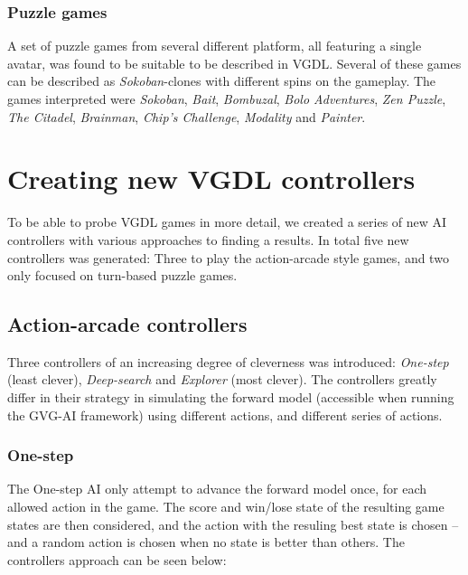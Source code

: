 \documentclass[a4paper,titlepage,final, twoside]{report}
\begin{document}
\subsubsection*{Puzzle games}
A set of puzzle games from several different platform, all featuring a single avatar, was found to be suitable to be described in VGDL. 
Several of these games can be described as \textit{Sokoban}-clones with different spins on the gameplay.
The games interpreted were \textit{Sokoban}, \textit{Bait}, \textit{Bombuzal}, \textit{Bolo Adventures}, \textit{Zen Puzzle}, \textit{The Citadel}, \textit{Brainman}, \textit{Chip's Challenge}, \textit{Modality} and \textit{Painter}.






\section{Creating new VGDL controllers}
To be able to probe VGDL games in more detail, we created a series of new AI controllers with various approaches to finding a results.
In total five new controllers was generated: Three to play the action-arcade style games, and two only focused on turn-based puzzle games.

\subsection{Action-arcade controllers}
\label{ssec_actioncontrollers}

Three controllers of an increasing degree of cleverness was introduced: \textit{One-step} (least clever), \textit{Deep-search} and \textit{Explorer} (most clever). 
The controllers greatly differ in their strategy in simulating the forward model (accessible when running the GVG-AI framework) using different actions, and different series of actions.

\subsubsection*{One-step}
The One-step AI only attempt to advance the forward model once, for each allowed action in the game.
The score and win/lose state of the resulting game states are then considered, and the action with the resuling best state is chosen -- and a random action is chosen when no state is better than others.
The controllers approach can be seen below:
\end{document}
